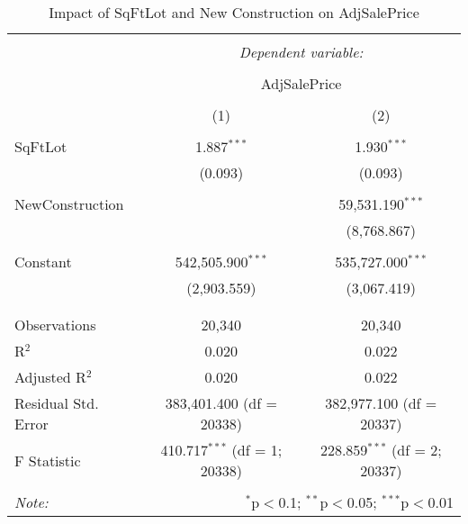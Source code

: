\documentclass[12pt,letterpaper]{article}
\begin{document}
\begin{table}[!htbp] \centering
	\caption{Impact of SqFtLot and New Construction on AdjSalePrice}
	\label{}
	\begin{tabular}{@{\extracolsep{5pt}}lcc}
		\\[-1.8ex]\hline
		\hline \\[-1.8ex]
		& \multicolumn{2}{c}{\textit{Dependent variable:}} \\
		\cline{2-3}
		\\[-1.8ex] & \multicolumn{2}{c}{AdjSalePrice} \\
		\\[-1.8ex] & (1) & (2)\\
		\hline \\[-1.8ex]
		SqFtLot & 1.887$^{***}$ & 1.930$^{***}$ \\
		& (0.093) & (0.093) \\
		& & \\
		NewConstruction &  & 59,531.190$^{***}$ \\
		&  & (8,768.867) \\
		& & \\
		Constant & 542,505.900$^{***}$ & 535,727.000$^{***}$ \\
		& (2,903.559) & (3,067.419) \\
		& & \\
		\hline \\[-1.8ex]
		Observations & 20,340 & 20,340 \\
		R$^{2}$ & 0.020 & 0.022 \\
		Adjusted R$^{2}$ & 0.020 & 0.022 \\
		Residual Std. Error & 383,401.400 (df = 20338) & 382,977.100 (df = 20337) \\
		F Statistic & 410.717$^{***}$ (df = 1; 20338) & 228.859$^{***}$ (df = 2; 20337) \\
		\hline
		\hline \\[-1.8ex]
		\textit{Note:}  & \multicolumn{2}{r}{$^{*}$p$<$0.1; $^{**}$p$<$0.05; $^{***}$p$<$0.01} \\
	\end{tabular}
\end{table}
\end{document}
